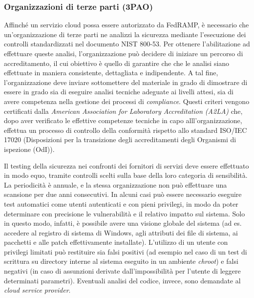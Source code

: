 \documentclass[../main.tex]{subfiles}
\begin{document}
\subsubsection{Organizzazioni di terze parti (3PAO)}
Affinché un servizio cloud possa essere autorizzato da FedRAMP, è necessario che un'organizzazione di terze parti ne analizzi la sicurezza mediante l'esecuzione dei controlli standardizzati nel documento NIST 800-53.
Per ottenere l'abilitazione ad effettuare queste analisi, l'organizzazione può decidere di iniziare un percorso di accreditamento, il cui obiettivo è quello di garantire che che le analisi siano effettuate in maniera consistente, dettagliata e indipendente.
A tal fine, l'organizzazione deve inviare sottomettere del materiale in grado di dimostrare di essere in grado sia di eseguire analisi tecniche adeguate ai livelli attesi, sia di avere competenza nella gestione dei processi di \textit{compliance}.
Questi criteri vengono certificati dalla \textit{American Association for Laboratory Accreditation (A2LA)} che, dopo aver verificato le effettive competenze tecniche in capo alll'organizzazione, effettua un processo di controllo della conformità rispetto allo standard ISO/IEC 17020 (Disposizioni per la transizione degli accreditamenti degli Organismi di ispezione (OdI)).


Il testing della sicurezza nei confronti dei fornitori di servizi deve essere effettuato in modo equo, tramite controlli scelti sulla base della loro categoria di sensibilità. La periodicità è annuale, e la stessa organizzazione non può effettuare una scansione per due anni consecutivi.
In alcuni casi può essere necessario eseguire test automatici come utenti autenticati e con pieni privilegi, in modo da poter determinare con precisione le vulnerabilità e il relativo impatto sul sistema. Solo in questo modo, infatti, è possibile avere una visione globale del sistema (ad es. accedere al registro di sistema di Windows, agli attributi dei file di sistema, ai pacchetti e alle patch effettivamente installate). L'utilizzo di un utente con privilegi limitati può restituire sia falsi positivi (ad esempio nel caso di un test di scrittura su directory interne al sistema eseguito in un ambiente \textit{chroot}) e falsi negativi (in caso di assunzioni derivate dall'impossibilità per l'utente di leggere determinati parametri).
Eventuali analisi del codice, invece, sono demandate al \textit{cloud service provider}.
\end{document}
